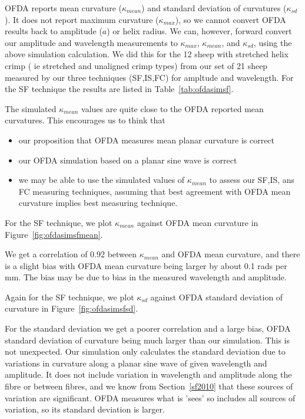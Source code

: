 \documentclass[titlepage,10pt]{article}  %
\begin{document}
 OFDA reports mean curvature ($\kappa_{mean}$) and standard deviation of curvatures ($\kappa_{sd}$). It does not report maximum curvature ($\kappa_{max}$), so we cannot convert OFDA results back to amplitude ($a$) or helix radius. We can, however, forward convert our amplitude and wavelength measurements to $\kappa_{max}$, $\kappa_{mean}$, and $\kappa_{sd}$, using the above simulation calculation. We did this for the 12 sheep with stretched helix crimp ( ie stretched and unaligned crimp types) from our set of 21 sheep measured by our three techniques (SF,IS,FC) for ampltude and wavelength. For the SF technique the results are listed in Table~\ref{tab:ofdasimsf}.

The simulated $\kappa_{mean}$ values are quite close to the OFDA reported mean curvatures. This encourages us to think that
\begin{itemize}
\item our proposition that OFDA measures mean planar curvature is correct
\item our OFDA simulation based on a planar sine wave is correct
\item we may be able to use the simulated values of $\kappa_{mean}$ to assess our SF,IS, ans FC measuring techniques, assuming that best agreement with OFDA mean curvature implies best measuring technique.
\end{itemize} 


 For the SF technique, we plot $\kappa_{mean}$ against OFDA mean curvature in Figure~\ref{fig:ofdasimsfmean}.

We get a correlation of 0.92 between $\kappa_{mean}$ and OFDA mean curvature, and there is a slight bias with OFDA mean curvature being larger by about 0.1 rads per mm.  The bias may be due to bias in the measured wavelength and amplitude.

 Again for the SF technique, we plot $\kappa_{sd}$ against OFDA standard deviation of curvature in Figure~\ref{fig:ofdasimsfsd}.

For the standard deviation we get a poorer correlation and a large bias, OFDA standard deviation of curvature being much larger than our simulation. This is not unexpected. Our simulation only calculates the standard deviation due to variations in curvature along a planar sine wave of given wavelength and amplitude. It does not include variation in wavelength and amplitude along the fibre or between fibres, and we know from Section~\ref{sf2010} that these sources of variation are significant. OFDA measures what is 'sees' so includes all sources of variation, so its standard deviation is larger.
\end{document}
